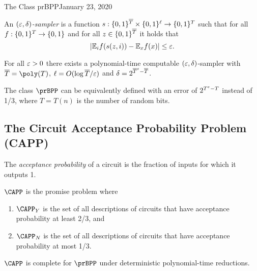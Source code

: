 \begin{lecture}{1}{The Class prBPP}{January 23, 2020}
\begin{definition}
  An \emph{$(\varepsilon, \delta)$-sampler} is a function $s :
  \{0,1\}^{\overline{T}} \times \{0,1\}^\ell \to \{0,1\}^T$ such that for
  all $f : \{0,1\}^T \to \{0,1\}$ and for all $z \in
  \{0,1\}^{\overline{T}}$ it holds that \[
    |\mathbb{E}_i f(s(z, i)) - \mathbb{E}_x f(x)| \le \varepsilon.
  \]
\end{definition}

\begin{theorem}
  For all $\varepsilon > 0$ there exists a polynomial-time computable $(\varepsilon,
  \delta)$-sampler with $\overline{T} = \poly(T)$, $\ell = O(\log
  \overline{T}/\varepsilon)$ and $\delta = 2^{\overline{T}^\varepsilon - \overline{T}}$.
\end{theorem}

\begin{corollary}
  The class $\prBPP$ can be equivalently defined with an error of $2^{T^\varepsilon -
  T}$ instead of 1/3, where $T = T(n)$ is the number of random bits.
\end{corollary}


\subsection{The Circuit Acceptance Probability Problem (CAPP)}

The \emph{acceptance probability} of a circuit is the fraction of inputs for
which it outputs 1.

\begin{definition}[$\CAPP$]
  $\CAPP$ is the promise problem where
  \begin{enumerate}
    \item $\CAPP_Y$ is the set of all descriptions of circuits that have
      acceptance probability at least 2/3, and
    \item $\CAPP_N$ is the set of all descriptions of circuits that have
      acceptance probability at most 1/3.
  \end{enumerate}
\end{definition}

\begin{theorem}
  $\CAPP$ is complete for $\prBPP$ under deterministic polynomial-time reductions.
\end{theorem}



\end{lecture}
